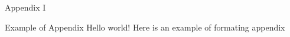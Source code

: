 \appendix

\begin{frame}{Appendix I}
    \begin{block}{Example of Appendix}\label{A1}
    Hello world! Here is an example of formating appendix 
    \end{block}
\end{frame}